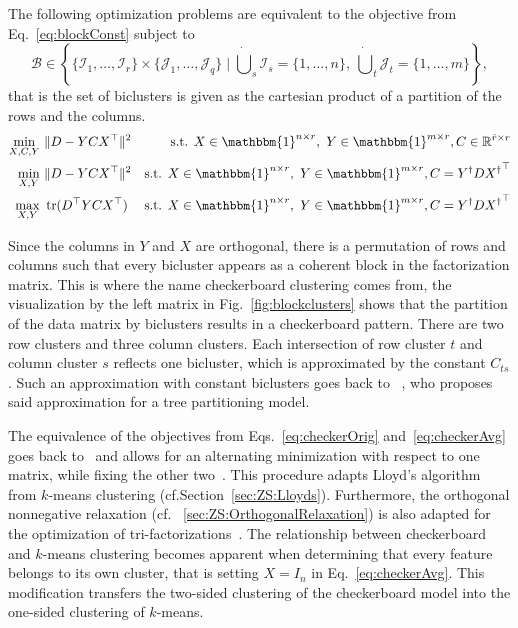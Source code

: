 \begin{theorem}\label{thm:checkerboard}
The following optimization problems are equivalent to the objective from Eq.~\eqref{eq:blockConst} subject to
\[\mathcal{B}\in \left\{\{\mathcal{I}_1,\ldots,\mathcal{I}_r\}\times \{\mathcal{J}_1,\ldots,\mathcal{J}_q\}\mid \dot\bigcup_{s}\mathcal{I}_s=\{1,\ldots,n\},\  \dot\bigcup_{t}\mathcal{J}_t=\{1,\ldots,m\}\right\},\]
that is the set of biclusters is given as the cartesian product of a partition of the rows and the columns.
\begin{align}
    \label{eq:checkerOrig}
    \min_{X,C,Y}&\ \|D-YCX^\top\|^2 &
    \text{s.t. } X\in \mathbbm{1}^{n\times r},\ Y\in\mathbbm{1}^{m\times r}, C\in\mathbb{R}^{\hat{r}\times r}\\ 
    \label{eq:checkerAvg}
\min_{X,Y}&\ \|D-YCX^\top\|^2&
\text{s.t. } X\in \mathbbm{1}^{n\times r},\ Y\in\mathbbm{1}^{m\times r}, C= Y^\dagger D {X^\dagger}^\top\\
\max_{X,Y}&\ \tr(D^\top YCX^\top) &
\text{s.t. } X\in \mathbbm{1}^{n\times r},\ Y\in\mathbbm{1}^{m\times r}, C= Y^\dagger D {X^\dagger}^\top
\end{align}
\end{theorem}
Since the columns in $Y$ and $X$ are orthogonal, there is a permutation of rows and columns such that every bicluster appears as a coherent block in the factorization matrix. This is where the name checkerboard clustering comes from, the visualization by the left matrix in Fig.~\ref{fig:blockclusters} shows that the partition of the data matrix by biclusters results in a checkerboard pattern. There are two row clusters and three column clusters. Each intersection of row cluster $t$ and column cluster $s$ reflects one bicluster, which is approximated by the constant $C_{ts}$. Such an approximation with constant biclusters goes back to ~\cite{hartigan1972direct}, who proposes said approximation for a tree partitioning model.

The equivalence of the objectives from Eqs.~\eqref{eq:checkerOrig} and~\eqref{eq:checkerAvg}  goes back to~\cite{gaul1996new} and allows for an alternating minimization with respect to one matrix, while fixing the other two~\citep{maurizio2001double,wang2011fast,cho2004minimum}. This procedure adapts Lloyd's algorithm from $k$-means clustering (cf.\@ Section~\ref{sec:ZS:Lloyds}). Furthermore, the orthogonal nonnegative relaxation (cf. \@Section~\ref{sec:ZS:OrthogonalRelaxation}) is also adapted for the optimization of tri-factorizations~\citep{ding2006orthogonal, yoo2010orthogonal}. The relationship between checkerboard and $k$-means clustering becomes apparent when determining that every feature belongs to its own cluster, that is setting $X=I_n$ in Eq.~\eqref{eq:checkerAvg}. This modification transfers the two-sided clustering of the checkerboard model into the one-sided clustering of $k$-means. 
